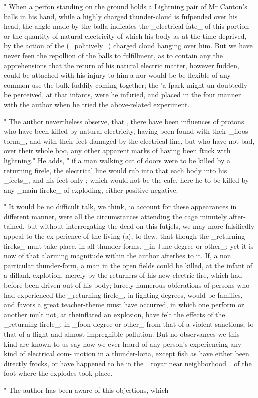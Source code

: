 " When a perfon standing on the ground holds a Lightning pair of Mr Canton's balls in his hand, while a highly charged thunder-cloud is fufpended over his head; the angle made by the balla indicates the \_electrical fate\_ of this portion or the quantity of natural electricity of which his body as at the time deprived, by the action of the (\_politively\_) charged cloud hanging over him. But we have never feen the repollion of the balls to fulfillment, as to contain any the apprehensions that the return of his natural electric matter, however fudden, could be attached with his injury to him a nor would be be flexible of any common use the bulk fuddily coming together; the 'a fpark might un-doubtedly be perceived, at that infants, were he infuried, and placed in the four manner with the author when he tried the above-related experiment.\par\medskip
" The author nevertheless observe, that , there have been influences of protons who have been killed by natural electricity, having been found with their \_floos torna\_, and with their feet damaged by the electrical line, but who have not bad, over their whole boo, any other apparent marks of having been ftuck with lightning." He adds, " if a man walking out of doors were to be killed by a returning firele, the electrical line would rub into that each body into his \_feets\_, and his feet only ; which would not be the cafe, here he to be killed by any \_main fireke\_ of exploding, either positive negative.\par\medskip
" It would be no difficult talk, we think, to account for these appearances in different manner, were all the circumstances attending the cage minutely after-tained, but without interrogating the dead on this futjels, we may more falsifiedly appeal to the ex-perience of the living (a), to flew, that though the \_returning fireks\_ mult take place, in all thunder-forms, \_in June degree or other\_; yet it is now of that alarming magnitude within the author afterhes to it. If, a non particular thunder-form, a man in the open fields could be killed, at the infant of a dillank explotion, merely by the returners of his new electric fire, which had before been driven out of his body; lureely numerous obferations of persons who had experienced the \_returning firele\_, in fighting degrees, would be families, and favors a great teacher-theme must have occurred, in which one perform or another mult not, at theinflated an explosion, have felt the effects of the \_returning firele\_, in \_foon degree or other\_ from that of a violent sanctions, to that of a flight and almost impregnible pollution. But no observances we this kind are known to us say how we ever heard of any person's experiencing any kind of electrical com- motion in a thunder-loria, except fish as have either been directly frocks, or have happened to be in the \_royar near neighborhood\_ of the foot where the explodes took place.\par\medskip
" The author has been aware of this objections, which\par\medskip
